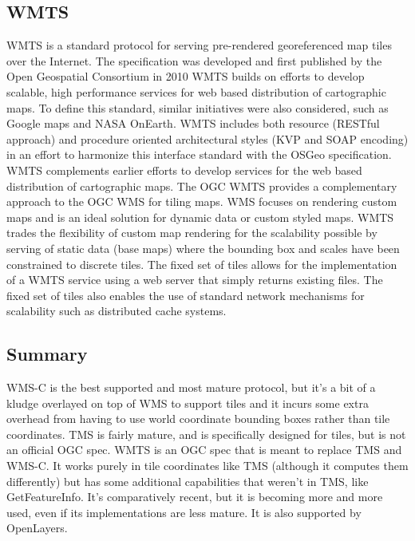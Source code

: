 \documentclass[11pt,a4paper,titlepage,oneside]{report}
\begin{document}
  \subsection{WMTS}
\gls{WMTS} is a standard \gls{protocol} for serving pre-rendered georeferenced map tiles over the Internet. The specification was developed and first published by the Open Geospatial Consortium in 2010
    \gls{WMTS} builds on efforts to develop scalable, high performance services for web based distribution of cartographic maps. To define this standard, similar initiatives were also considered, such as Google maps and NASA OnEarth. \gls{WMTS} includes both resource (RESTful approach) and procedure oriented architectural styles (KVP and SOAP encoding) in an effort to harmonize this interface standard with the OSGeo specification.
    \gls{WMTS} complements earlier efforts to develop services for the web based distribution of cartographic maps. The \gls{OGC} \gls{WMTS} provides a complementary approach to the \gls{OGC} \gls{WMS} for tiling maps. \gls{WMS} focuses on rendering custom maps and is an ideal solution for dynamic data or custom styled maps. \gls{WMTS} trades the flexibility of custom map rendering for the scalability possible by serving of static data (base maps) where the bounding box and scales have been constrained to discrete tiles. The fixed set of tiles allows for the implementation of a \gls{WMTS} service using a web server that simply returns existing files. The fixed set of tiles also enables the use of standard network mechanisms for scalability such as distributed cache systems.

  \subsection{Summary}
    WMS-C is the best supported and most mature \gls{protocol}, but it's a bit of a kludge overlayed on top of \gls{WMS} to support tiles and it incurs some extra overhead from having to use world coordinate bounding boxes rather than tile coordinates.
    \gls{TMS} is fairly mature, and is specifically designed for tiles, but is not an official \gls{OGC} spec.
    \gls{WMTS} is an \gls{OGC} spec that is meant to replace \gls{TMS} and WMS-C. It works purely in tile coordinates like \gls{TMS} (although it computes them differently) but has some additional capabilities that weren't in \gls{TMS}, like GetFeatureInfo. It's comparatively recent, but it is becoming more and more used, even if its implementations are less mature. It is also supported by OpenLayers.
\end{document}
